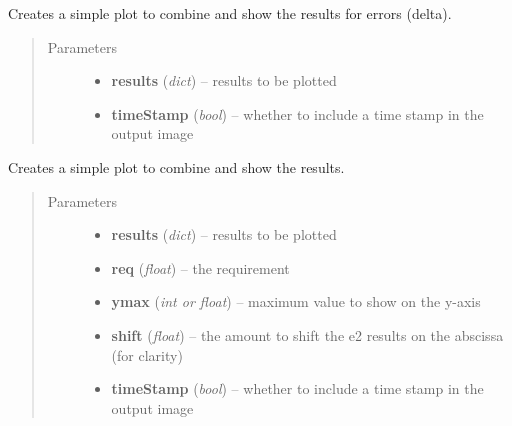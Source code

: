 \documentclass[a4paper,11pt,english]{sphinxmanual}
\begin{document}

\begin{fulllineitems}
\label{reduction:analysis.biasCalibration.plotNumberOfFramesDelta}
Creates a simple plot to combine and show the results for errors (delta).
\begin{quote}\begin{description}
\item[{Parameters}] \leavevmode\begin{itemize}
\item {} 
\textbf{results} (\emph{dict}) -- results to be plotted

\item {} 
\textbf{timeStamp} (\emph{bool}) -- whether to include a time stamp in the output image

\end{itemize}

\end{description}\end{quote}

\end{fulllineitems}


\begin{fulllineitems}
\label{reduction:analysis.biasCalibration.plotNumberOfFramesSigma}
Creates a simple plot to combine and show the results.
\begin{quote}\begin{description}
\item[{Parameters}] \leavevmode\begin{itemize}
\item {} 
\textbf{results} (\emph{dict}) -- results to be plotted

\item {} 
\textbf{req} (\emph{float}) -- the requirement

\item {} 
\textbf{ymax} (\emph{int or float}) -- maximum value to show on the y-axis

\item {} 
\textbf{shift} (\emph{float}) -- the amount to shift the e2 results on the abscissa (for clarity)

\item {} 
\textbf{timeStamp} (\emph{bool}) -- whether to include a time stamp in the output image

\end{itemize}

\end{description}\end{quote}

\end{fulllineitems}
\end{document}
